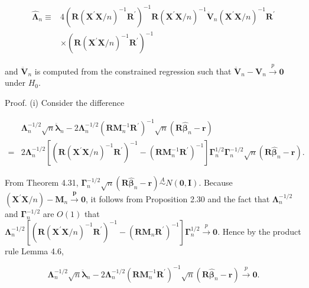 \documentclass[10pt]{article}
\begin{document}
$$
\begin{aligned}
\hat{\mathbf{\Lambda}}_{n} \equiv & 4\left(\mathbf{R}\left(\mathbf{X}^{\prime} \mathbf{X} / n\right)^{-1} \mathbf{R}^{\prime}\right)^{-1} \mathbf{R}\left(\mathbf{X}^{\prime} \mathbf{X} / n\right)^{-1} \ddot{\mathbf{V}}_{n}\left(\mathbf{X}^{\prime} \mathbf{X} / n\right)^{-1} \mathbf{R}^{\prime} \\
& \times\left(\mathbf{R}\left(\mathbf{X}^{\prime} \mathbf{X} / n\right)^{-1} \mathbf{R}^{\prime}\right)^{-1}
\end{aligned}
$$

and $\ddot{\mathbf{V}}_{n}$ is computed from the constrained regression such that $\ddot{\mathbf{V}}_{n}- \mathbf{V}_{n} \xrightarrow{p} \mathbf{0}$ under $H_{0}$.

Proof. (i) Consider the difference

$$
\begin{aligned}
& \boldsymbol{\Lambda}_{n}^{-1 / 2} \sqrt{n} \ddot{\boldsymbol{\lambda}}_{n}-2 \boldsymbol{\Lambda}_{n}^{-1 / 2}\left(\mathbf{R} \mathbf{M}_{n}^{-1} \mathbf{R}^{\prime}\right)^{-1} \sqrt{n}\left(\mathbf{R} \hat{\boldsymbol{\beta}}_{n}-\mathbf{r}\right) \\
= & 2 \boldsymbol{\Lambda}_{n}^{-1 / 2}\left[\left(\mathbf{R}\left(\mathbf{X}^{\prime} \mathbf{X} / n\right)^{-1} \mathbf{R}^{\prime}\right)^{-1}-\left(\mathbf{R} \mathbf{M}_{n}^{-1} \mathbf{R}^{\prime}\right)^{-1}\right] \boldsymbol{\Gamma}_{n}^{1 / 2} \boldsymbol{\Gamma}_{n}^{-1 / 2} \sqrt{n}\left(\mathbf{R} \hat{\boldsymbol{\beta}}_{n}-\mathbf{r}\right) .
\end{aligned}
$$

From Theorem 4.31, $\boldsymbol{\Gamma}_{n}^{-1 / 2} \sqrt{n}\left(\mathbf{R} \hat{\boldsymbol{\beta}}_{n}-\mathbf{r}\right) \stackrel{A}{\sim} N(\mathbf{0}, \mathbf{I})$. Because $\left(\mathbf{X}^{\prime} \mathbf{X} / n\right)- \mathbf{M}_{n} \xrightarrow{\boldsymbol{p}} \mathbf{0}$, it follows from Proposition 2.30 and the fact that $\boldsymbol{\Lambda}_{n}^{-1 / 2}$ and $\boldsymbol{\Gamma}_{n}^{-1 / 2}$ are $O(1)$ that $\boldsymbol{\Lambda}_{n}^{-1 / 2}\left[\left(\mathbf{R}\left(\mathbf{X}^{\prime} \mathbf{X} / n\right)^{-1} \mathbf{R}^{\prime}\right)^{-1}-\left(\mathbf{R} \mathbf{M}_{n} \mathbf{R}^{\prime}\right)^{-1}\right] \boldsymbol{\Gamma}_{n}^{1 / 2} \xrightarrow{p} \mathbf{0}$. Hence by the product rule Lemma 4.6,

$$
\mathbf{\Lambda}_{n}^{-1 / 2} \sqrt{n} \ddot{\boldsymbol{\lambda}}_{n}-2 \mathbf{\Lambda}_{n}^{-1 / 2}\left(\mathbf{R} \mathbf{M}_{n}^{-1} \mathbf{R}^{\prime}\right)^{-1} \sqrt{n}\left(\mathbf{R} \hat{\boldsymbol{\beta}}_{n}-\mathbf{r}\right) \xrightarrow{p} \mathbf{0} .
$$
\end{document}
